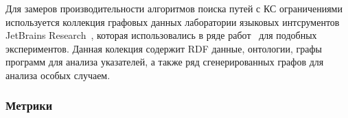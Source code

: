 \begin{table}[t]
\begin{center}
\caption{Разреженные матричные данные}
\label{table:sparse_matrices}
{}
\end{center}
\end{table}

Для замеров производительности алгоритмов поиска путей с КС ограничениями используется коллекция графовых данных лаборатории языковых интсрументов JetBrains Research~\cite{net:cfpq_data}, которая использовались в ряде работ~\cite{inproceedings:matrix_cfpq, inproceedings:cfpq_matrix_evaluation, inbook:kronecker_cfpq_adbis, inproceedings:cfqp_matrix_with_single_source} для подобных экспериментов. Данная колекция содержит RDF данные, онтологии, графы программ для анализа указателей, а также ряд сгенерированных графов для анализа особых случаем. 

\subsubsection*{Метрики}

